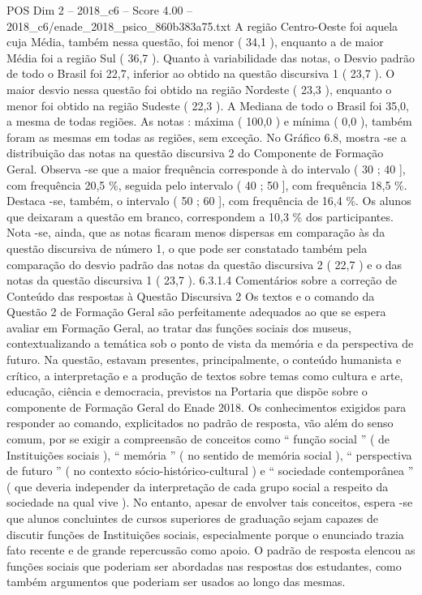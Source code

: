 \begin{textsample}{POS Dim 2 – 2018\_c6 – Score 4.00 – 2018\_c6/enade\_2018\_psico\_860b383a75.txt}
A região Centro-Oeste foi aquela cuja Média, também nessa questão, foi menor ( 34,1 ), enquanto a de maior Média foi a região Sul ( 36,7 ).
Quanto à variabilidade das notas, o Desvio padrão de todo o Brasil foi 22,7, inferior ao obtido na questão discursiva 1 ( 23,7 ).
O maior desvio nessa questão foi obtido na região Nordeste ( 23,3 ), enquanto o menor foi obtido na região Sudeste ( 22,3 ).
A Mediana de todo o Brasil foi 35,0, a mesma de todas regiões.
As notas : máxima ( 100,0 ) e mínima ( 0,0 ), também foram as mesmas em todas as regiões, sem exceção.
No Gráfico 6.8, mostra -se a distribuição das notas na questão discursiva 2 do Componente de Formação Geral.
Observa -se que a maior frequência corresponde à do intervalo ( 30 ; 40 ], com frequência 20,5 \%, seguida pelo intervalo ( 40 ; 50 ], com frequência 18,5 \%.
Destaca -se, também, o intervalo ( 50 ; 60 ], com frequência de 16,4 \%.
Os alunos que deixaram a questão em branco, correspondem a 10,3 \% dos participantes.
Nota -se, ainda, que as notas ficaram menos dispersas em comparação às da questão discursiva de número 1, o que pode ser constatado também pela comparação do desvio padrão das notas da questão discursiva 2 ( 22,7 ) e o das notas da questão discursiva 1 ( 23,7 ). 6.3.1.4 Comentários sobre a correção de Conteúdo das respostas à Questão Discursiva 2 Os textos e o comando da Questão 2 de Formação Geral são perfeitamente adequados ao que se espera avaliar em Formação Geral, ao tratar das funções sociais dos museus, contextualizando a temática sob o ponto de vista da memória e da perspectiva de futuro.
Na questão, estavam presentes, principalmente, o conteúdo humanista e crítico, a interpretação e a produção de textos sobre temas como cultura e arte, educação, ciência e democracia, previstos na Portaria que dispõe sobre o componente de Formação Geral do Enade 2018.
Os conhecimentos exigidos para responder ao comando, explicitados no padrão de resposta, vão além do senso comum, por se exigir a compreensão de conceitos como “ função social ” ( de Instituições sociais ), “ memória ” ( no sentido de memória social ), “ perspectiva de futuro ” ( no contexto sócio-histórico-cultural ) e “ sociedade contemporânea ” ( que deveria independer da interpretação de cada grupo social a respeito da sociedade na qual vive ).
No entanto, apesar de envolver tais conceitos, espera -se que alunos concluintes de cursos superiores de graduação sejam capazes de discutir funções de Instituições sociais, especialmente porque o enunciado trazia fato recente e de grande repercussão como apoio.
O padrão de resposta elencou as funções sociais que poderiam ser abordadas nas respostas dos estudantes, como também argumentos que poderiam ser usados ao longo das mesmas.

\end{textsample}
